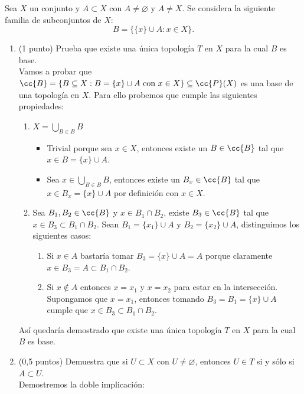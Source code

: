\documentclass[12pt]{article}
\begin{document}
    \begin{ejercicio}
    Sea $X$ un conjunto y $A \subset X$ con $A \neq \varnothing$ y $A \neq X$. Se considera la siguiente familia de subconjuntos de $X$:
    \[
        B = \{\{x\} \cup A : x \in X\}.
    \]
    \begin{enumerate}
        \item (1 punto) Prueba que existe una única topología $T$ en $X$ para la cual $B$ es base.\\
        Vamos a probar que $\cc{B} = \{B\subseteq X: B = \{x\}\cup A \text{ con } x \in X\}\subseteq \cc{P}(X)$ es una base de una topología en $X$. Para ello probemos que cumple las siguientes propiedades:
        \begin{enumerate}
            \item[(B1)] $X = \bigcup_{B \in B} B$
            \begin{itemize}
                \item[$\subseteq$] Trivial porque sea $x \in X$, entonces existe un $B\in \cc{B}$ tal que $x \in B = \{x\} \cup A$.
                \item[$\supseteq$] Sea $x \in \bigcup_{B \in B} B$, entonces existe un $B_x\in \cc{B}$ tal que $x \in B_x = \{x\} \cup A$ por definición con $x\in X$.
            \end{itemize}
            \item[(B2)] Sea $B_1, B_2 \in \cc{B}$ y $x \in B_1 \cap B_2$, existe $B_3 \in \cc{B}$ tal que $x \in B_3 \subset B_1 \cap B_2$. Sean $B_1 = \{x_1\}\cup A$ y $B_2 = \{x_2\}\cup A$, distinguimos los siguientes casos:
            \begin{enumerate}
                \item Si $x\in A$ bastaría tomar $B_3 = \{x\} \cup A = A$ porque claramente $x\in B_3 = A \subset B_1 \cap B_2$.
                \item Si $x\notin A$ entonces $x = x_1$ y $x = x_2$ para estar en la intersección. Supongamos que $x = x_1$, entonces tomando $B_3 = B_1 = \{x\} \cup A$ cumple que $x \in B_3 \subset B_1 \cap B_2$.
            \end{enumerate}
        \end{enumerate}
        Así quedaría demostrado que existe una única topología $T$ en $X$ para la cual $B$ es base.
        \item (0,5 puntos) Demuestra que si $U \subset X$ con $U \neq \varnothing$, entonces $U \in T$ si y sólo si $A \subset U$.\\
        Demostremos la doble implicación:

\end{enumerate}
\end{ejercicio}
\end{document}
